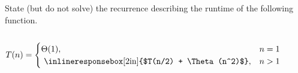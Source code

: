 \begin{prob}
    State (but do not solve) the recurrence describing the runtime of the following function.

    \inputminted{python}{\thisdir/code.py}

    \vspace{1em}

    $
        T(n) = \begin{cases}
            \Theta(1), & n = 1\\
            \text{
                \inlineresponsebox[2in]{$T(n/2) + \Theta(n^2)$}%
            }, & n > 1
        \end{cases}
    $

\end{prob}
